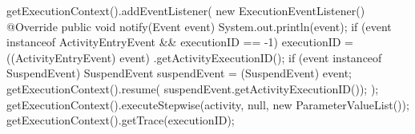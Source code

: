 \documentclass{llncs}
\begin{document}
\begin{lstsingle}[language=Java,caption=Executing the activity stepwise and getting the execution trace,label=lst:execution]
getExecutionContext().addEventListener(
  new ExecutionEventListener() {
  @Override
  public void notify(Event event) {
    System.out.println(event);
    if (event instanceof ActivityEntryEvent 
      && executionID == -1) {
      executionID = ((ActivityEntryEvent) event)
          .getActivityExecutionID();
    }
    if (event instanceof SuspendEvent) {
      SuspendEvent suspendEvent = (SuspendEvent) event;
      getExecutionContext().resume(
          suspendEvent.getActivityExecutionID());
    }
  }
});
getExecutionContext().executeStepwise(activity, null, 
  new ParameterValueList());
getExecutionContext().getTrace(executionID);
\end{lstsingle}
\end{document}
